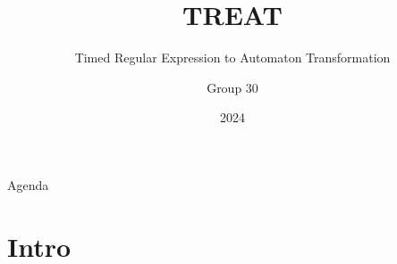 \documentclass{beamer}
\title{TREAT}
\subtitle{Timed Regular Expression to Automaton Transformation}
\author{Group 30}
\institute{Aalborg Universitet}
\date{2024}
\newcommand{\name}{}
\begin{document}
\frame{\titlepage}

\begin{frame}{Agenda}
    \tableofcontents
\end{frame}

\section{Intro} %
\renewcommand{\name}{Marcus}


\renewcommand{\name}{Frederik}


\renewcommand{\name}{Emil}

\end{document}
